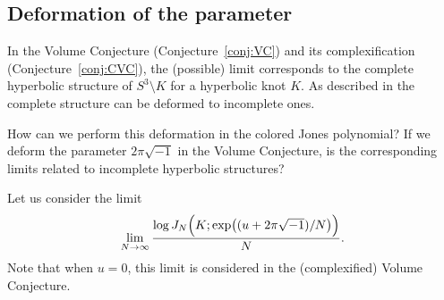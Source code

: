 \documentclass{amsart}
\theoremstyle{definition}
\theoremstyle{remark}
\numberwithin{equation}{section}
\begin{document}
\subsection{Deformation of the parameter}
In the Volume Conjecture (Conjecture~\ref{conj:VC}) and its complexification (Conjecture~\ref{conj:CVC}), the (possible) limit corresponds to the complete hyperbolic structure of $S^3\setminus{K}$ for a hyperbolic knot $K$.
As described in \cite[Chapter~4]{Thurston:GT3M} the complete structure can be deformed to incomplete ones.
\par
How can we perform this deformation in the colored Jones polynomial?
If we deform the parameter $2\pi\sqrt{-1}$ in the Volume Conjecture, is the corresponding limits related to incomplete hyperbolic structures?
\par
Let us consider the limit
\begin{equation*}
  \lim_{N\to\infty}\frac{\log J_N\Bigl(K;\exp\bigl((u+2\pi\sqrt{-1})/N\bigr)\Bigr) }{N}.
\end{equation*}
Note that when $u=0$, this limit is considered in the (complexified) Volume Conjecture.
\par
\end{document}
